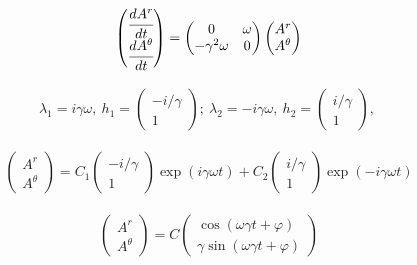 \documentclass[a4paper]{article}
\newcommand{\inner}[1]{\left( #1 \right)}
\renewcommand{\phi}{\varphi}
\numberwithin{equation}{section}
\begin{document}
\begin{gather}
    \begin{pmatrix}
        \cfrac{d A^r}{d t} \\
        \cfrac{d A^\theta}{d t}  
    \end{pmatrix}
    = 
    \begin{pmatrix}
        0 & \omega\\
        -\gamma^2 \omega & 0
    \end{pmatrix}
    \begin{pmatrix}
        A^r \\ A^\theta
    \end{pmatrix}
\end{gather}

\begin{gather}
    \lambda_1 = i \gamma \omega, \ 
    h_1 =
    \begin{pmatrix}
        -i/\gamma \\ 1
    \end{pmatrix}; \
    \lambda_2 = -i \gamma \omega, \ 
    h_2 =
    \begin{pmatrix}
        i/\gamma \\ 1
    \end{pmatrix}, \
\end{gather}

\begin{gather}
    \begin{pmatrix}
        A^r \\ A^\theta
    \end{pmatrix}
    =
    C_1 
    \begin{pmatrix}
        -i/\gamma \\ 1
    \end{pmatrix}
    \exp\inner{i\gamma \omega t}
    +
    C_2
    \begin{pmatrix}
        i/\gamma \\ 1
    \end{pmatrix}
    \exp\inner{-i\gamma \omega t}
\end{gather}

\begin{gather}
    \begin{pmatrix}
        A^r \\ A^\theta
    \end{pmatrix}
    =
    C
    \begin{pmatrix}
        \cos \inner{\omega \gamma t + \phi} \\        
        \gamma \sin \inner{\omega \gamma t + \phi}        
    \end{pmatrix}
\end{gather}
\end{document}
